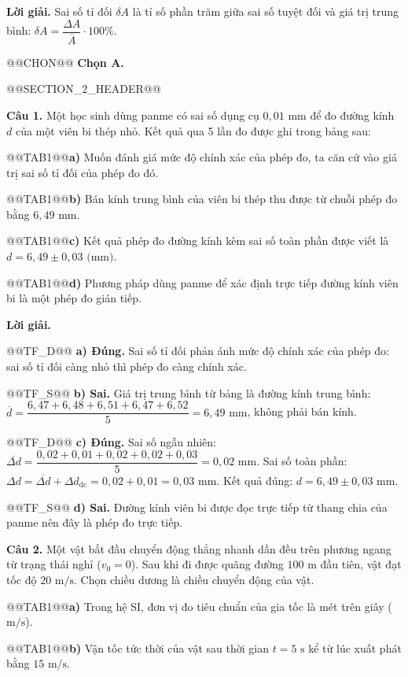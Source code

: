 \documentclass{article}
\begin{document}
\textbf{Lời giải.} Sai số tỉ đối $\delta A$ là tỉ số phần trăm giữa sai số tuyệt đối và giá trị trung bình: $\delta A = \dfrac{\Delta A}{\overline{A}} \cdot 100\%$.

@@CHON@@ \textbf{Chọn A.}

@@SECTION_2_HEADER@@

\textbf{Câu 1.} Một học sinh dùng panme có sai số dụng cụ $0{,}01\text{ mm}$ để đo đường kính $d$ của một viên bi thép nhỏ. Kết quả qua 5 lần đo được ghi trong bảng sau:

@@TAB1@@\textbf{a)} Muốn đánh giá mức độ chính xác của phép đo, ta căn cứ vào giá trị sai số tỉ đối của phép đo đó.

@@TAB1@@\textbf{b)} Bán kính trung bình của viên bi thép thu được từ chuỗi phép đo bằng $6{,}49\text{ mm}$.

@@TAB1@@\textbf{c)} Kết quả phép đo đường kính kèm sai số toàn phần được viết là $d = 6{,}49 \pm 0{,}03\text{ (mm)}$.

@@TAB1@@\textbf{d)} Phương pháp dùng panme để xác định trực tiếp đường kính viên bi là một phép đo gián tiếp.

\textbf{Lời giải.}

@@TF_D@@ \textbf{a) Đúng.} Sai số tỉ đối phản ánh mức độ chính xác của phép đo: sai số tỉ đối càng nhỏ thì phép đo càng chính xác.

@@TF_S@@ \textbf{b) Sai.} Giá trị trung bình từ bảng là đường kính trung bình: $\overline{d} = \dfrac{6{,}47 + 6{,}48 + 6{,}51 + 6{,}47 + 6{,}52}{5} = 6{,}49\text{ mm}$, không phải bán kính.

@@TF_D@@ \textbf{c) Đúng.} Sai số ngẫu nhiên: $\overline{\Delta d} = \dfrac{0{,}02 + 0{,}01 + 0{,}02 + 0{,}02 + 0{,}03}{5} = 0{,}02\text{ mm}$. Sai số toàn phần: $\Delta d = \overline{\Delta d} + \Delta d_{\text{dc}} = 0{,}02 + 0{,}01 = 0{,}03\text{ mm}$. Kết quả đúng: $d = 6{,}49 \pm 0{,}03\text{ mm}$.

@@TF_S@@ \textbf{d) Sai.} Đường kính viên bi được đọc trực tiếp từ thang chia của panme nên đây là phép đo trực tiếp.

\textbf{Câu 2.} Một vật bắt đầu chuyển động thẳng nhanh dần đều trên phương ngang từ trạng thái nghỉ ($v_0 = 0$). Sau khi đi được quãng đường $100\text{ m}$ đầu tiên, vật đạt tốc độ $20\text{ m/s}$. Chọn chiều dương là chiều chuyển động của vật.

@@TAB1@@\textbf{a)} Trong hệ SI, đơn vị đo tiêu chuẩn của gia tốc là mét trên giây ($\text{m/s}$).

@@TAB1@@\textbf{b)} Vận tốc tức thời của vật sau thời gian $t = 5\text{ s}$ kể từ lúc xuất phát bằng $15\text{ m/s}$.
\end{document}
